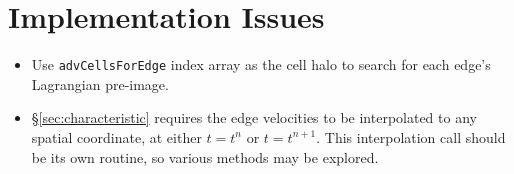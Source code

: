 \documentclass[11pt]{report}
\begin{document}
\section{Implementation Issues}

\begin{itemize}
\item Use {\tt advCellsForEdge} index array as the cell halo to search for
  each edge's Lagrangian pre-image.
\item \S\ref{sec:characteristic} requires the edge velocities to be
  interpolated to any spatial coordinate, at either $t=t^n$ or $t=t^{n+1}$.
  This interpolation call should be its own routine, so various methods may be
  explored.
\end{itemize}
\end{document}
